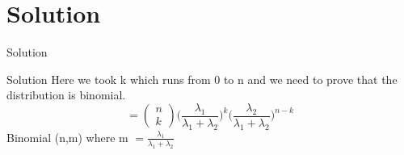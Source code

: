 \documentclass{beamer}
\begin{document}
\section{Solution}
\begin{frame}{Solution}
\begin{block}{Solution}
Here we took k which runs from 0 to n and we need to prove that the distribution is binomial.
$$
=
\begin{pmatrix}
n\\
k
\end{pmatrix}
\Big(\frac{\lambda_1}{\lambda_1+\lambda_2}\Big)^k \Big(\frac{\lambda_2}{\lambda_1+\lambda_2}\Big)^{n-k}
$$
Binomial (n,m) where m
$
 = \frac{\lambda_1}{\lambda_1+\lambda_2}
$
\end{block}
\end{frame}
\end{document}
